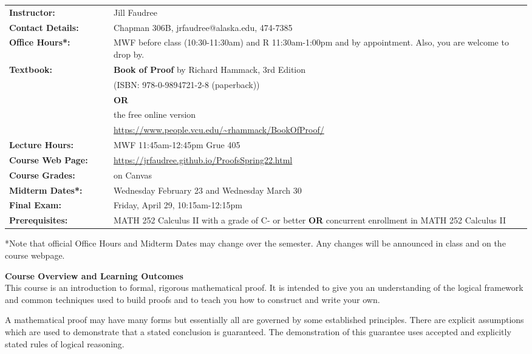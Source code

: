 \documentclass[12pt]{article}
\renewcommand{\emph}[1]{\textsf{\textbf{#1}}}
\newcommand{\localhead}[1]{\par\smallskip\textbf{#1}\nobreak\\}%
\def\heading#1{\localhead{\large\emph{#1}}}
\begin{document}
\begin{tabular}{p{0.2\linewidth}  p{0.8\linewidth}}
\textbf{Instructor:}& Jill Faudree\\
\textbf{Contact Details:}&Chapman 306B, jrfaudree@alaska.edu, 474-7385\\
\textbf{Office Hours*:}& MWF before class (10:30-11:30am) and R 11:30am-1:00pm and by appointment. Also, you are welcome to drop by.\\
\textbf{Textbook:} &\emph{Book of Proof} by Richard Hammack, 3rd Edition\\
 &(ISBN: 978-0-9894721-2-8 (paperback))\\
 & \textbf{OR}\\
 & the free online version \\
 &\url{https://www.people.vcu.edu/~rhammack/BookOfProof/}\\
\textbf{Lecture Hours:}& MWF 11:45am-12:45pm Grue 405\\
\textbf{Course Web Page:}& \url{https://jrfaudree.github.io/ProofsSpring22.html}\\
\textbf{Course Grades:}& on Canvas\\
\textbf{Midterm Dates*:}& Wednesday February 23 and Wednesday March 30\\
\textbf{Final Exam:}& Friday, April 29, 10:15am-12:15pm\\
\textbf{Prerequisites:} &MATH 252 Calculus II with a grade of C- or better \textbf{OR} concurrent enrollment in MATH 252 Calculus II\\
\end{tabular}

*Note that official Office Hours and Midterm Dates may change over the semester. Any changes will be announced in class and on the course webpage.\\

\heading{Course Overview and Learning Outcomes}

This course is an introduction to formal, rigorous mathematical proof. It is intended to give you an understanding of the logical framework and common techniques used to build proofs and to teach you how to construct and write your own. 

A mathematical proof may have many forms but essentially all are governed by some established principles. There are explicit assumptions which are used to demonstrate that a stated conclusion is guaranteed. The demonstration of this guarantee uses accepted and explicitly stated rules of logical reasoning. 
\end{document}
